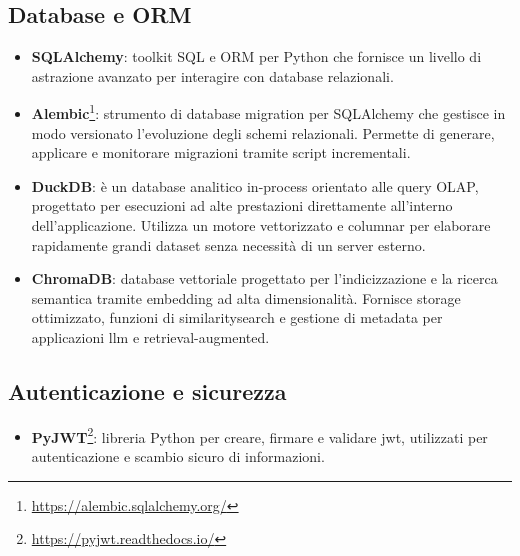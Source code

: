 \subsection{Database e ORM}
\begin{itemize}
    \item \textbf{SQLAlchemy}: toolkit SQL e ORM per Python che fornisce un livello di astrazione avanzato per interagire con database relazionali.
    \item \textbf{Alembic}\footnote{\url{https://alembic.sqlalchemy.org/}}: strumento di database migration per SQLAlchemy che gestisce in modo versionato l’evoluzione degli schemi relazionali. Permette di generare, applicare e monitorare migrazioni tramite script incrementali.
    \item \textbf{DuckDB}: è un database analitico in-process orientato alle query OLAP, progettato per esecuzioni ad alte prestazioni direttamente all’interno dell’applicazione. Utilizza un motore vettorizzato e columnar per elaborare rapidamente grandi dataset senza necessità di un server esterno.
    \item \textbf{ChromaDB}: database vettoriale progettato per l’indicizzazione e la ricerca semantica tramite \gls{embedding} ad alta dimensionalità. Fornisce storage ottimizzato, funzioni di \gls{similaritysearch} e gestione di metadata per applicazioni \gls{llm} e retrieval-augmented.
\end{itemize}

\subsection{Autenticazione e sicurezza}
\begin{itemize}
    \item \textbf{PyJWT}\footnote{\url{https://pyjwt.readthedocs.io/}}: libreria Python per creare, firmare e validare \gls{jwt}, utilizzati per autenticazione e scambio sicuro di informazioni.
\end{itemize}

